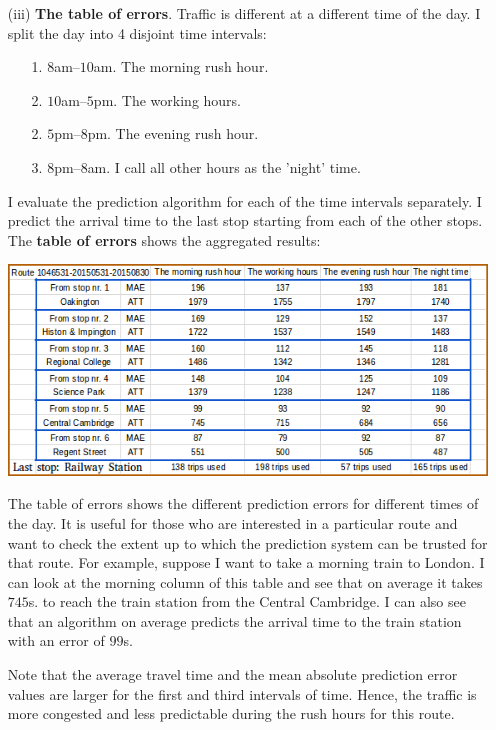 \documentclass[12pt,a4paper,oneside,openright]{report}
\begin{document}
\begin{enumerate}

\item[(iii)] \textbf{The table of errors}. Traffic is different at a different time of
the day. I split the day into 4 disjoint time intervals:

\begin{enumerate}
\item[1.] $8$am--$10$am. The morning rush hour.
\item[2.] $10$am--$5$pm. The working hours.
\item[2.] $5$pm--$8$pm. The evening rush hour.
\item[3.] $8$pm--$8$am. I call all other hours as the 'night' time.



\end{enumerate}

I evaluate the prediction algorithm for each of the time intervals separately. I predict the
arrival time to the last stop starting from each of the other stops. The 
\textbf{table of errors} shows the aggregated results:

\includegraphics[width=\textwidth]{figs/table_of_times.png}

The table of errors shows the different prediction errors for different
times of the day. It is useful for those who are interested in a
particular route and want to check the extent up to which the prediction system 
can be trusted for that route. For example, suppose I want to take a morning train
to London. I can look at the morning column of this table and see that on average
it takes $745$s. to reach the train station from the Central Cambridge. I can
also see that an algorithm on average predicts the arrival time to the train station
with an error of $99$s.

Note that the average travel time and the mean absolute
prediction error values are larger for the first and third intervals of time.
Hence, the traffic is more congested and less predictable
during the rush hours for this route.

\end{enumerate}
\end{document}
